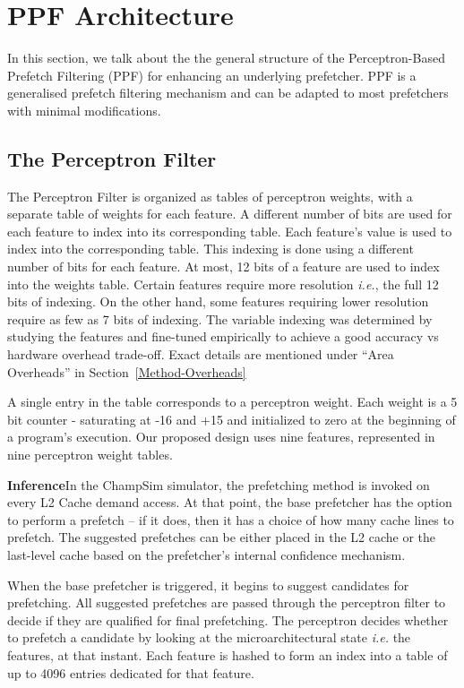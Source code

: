 \section{PPF Architecture}
\label{Arch}

In this section, we talk about the the general structure of the 
Perceptron-Based Prefetch Filtering (PPF) for enhancing an underlying prefetcher.  
PPF is a generalised prefetch filtering mechanism and can be adapted to 
most prefetchers with minimal modifications. %

\subsection{The Perceptron Filter}
\label{Arch-Perceptron}
The Perceptron Filter is organized as tables of perceptron weights, 
with a separate table of weights for each feature.  
A different number of bits are used for each feature to index into its 
corresponding table.
Each feature's value is used to index into the corresponding table.
This indexing is done using a different number of bits for each feature.  
At most, 12 bits of a feature are used to index into the
weights table. Certain features require more resolution
\textit{i.e.}, the full 12 bits of indexing.  On the other hand, some
features requiring lower resolution require as few as 7 bits of indexing. 
The variable indexing was determined by studying the
features and fine-tuned empirically to achieve a good accuracy
vs hardware overhead trade-off.  Exact details are mentioned under ``Area Overheads''
in Section~\ref{Method-Overheads}

A single entry in the table corresponds to a perceptron weight.  Each
weight is a 5 bit counter - saturating at -16 and +15 and initialized to zero at the 
beginning of a program's execution. Our proposed design uses nine features, 
represented in nine perceptron weight tables. 

\textbf{Inference}\newline In the ChampSim simulator, the prefetching method is 
invoked on every L2 Cache demand access.  At that point, the base prefetcher
has the option to perform a prefetch -- if it does, then it has a choice
of how many cache lines to prefetch.  The suggested prefetches can be either placed
in the L2 cache or the last-level cache based on the prefetcher's internal confidence mechanism.

When the base prefetcher is triggered, it begins to suggest candidates for
prefetching. All suggested prefetches are passed through the perceptron
filter to decide if they are qualified for final prefetching. 
The perceptron decides whether to prefetch a candidate by looking at the microarchitectural state 
\textit{i.e.} the features, at that instant. Each feature is hashed to form an index into a table of up to 
4096 entries dedicated for that feature. 

